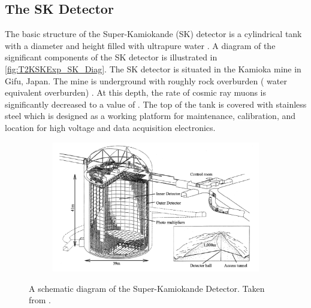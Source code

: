 \subsection{The SK Detector}
\label{subsec:T2KSKExp_SKDetector}

The basic structure of the Super-Kamiokande (SK) detector is a cylindrical tank with a diameter  and height  filled with ultrapure water \cite{Abe_2014_SKCalib}. A diagram of the significant components of the SK detector is illustrated in \autoref{fig:T2KSKExp_SK_Diag}. The SK detector is situated in the Kamioka mine in Gifu, Japan. The mine is underground with roughly  rock overburden ( water equivalent overburden) \cite{Fukuda2003-ly}. At this depth, the rate of cosmic ray muons is significantly decreased to a value of . The top of the tank is covered with stainless steel which is designed as a working platform for maintenance, calibration, and location for high voltage and data acquisition electronics.

\begin{figure}[h]
  \begin{subfigure}[t]{0.95\textwidth}
    \includegraphics[width=\textwidth, trim={0mm 0mm 0mm 0mm}, clip,page=1]{Figures/Detectors/SKDiagram.pdf}
  \end{subfigure}
  \caption{A schematic diagram of the Super-Kamiokande Detector. Taken from \cite{Itow2001-bc}.}
  \label{fig:T2KSKExp_SK_Diag}
\end{figure}

